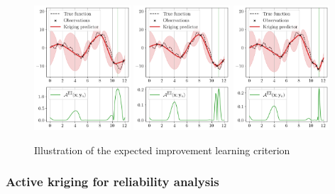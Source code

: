\begin{figure}[ht]
    \centering
    \includegraphics[width=0.32\textwidth]{../numerical_experiments/chapter1/figures/bayesian_opt_0.png}
    \includegraphics[width=0.32\textwidth]{../numerical_experiments/chapter1/figures/bayesian_opt_1.png}
    \includegraphics[width=0.32\textwidth]{../numerical_experiments/chapter1/figures/bayesian_opt_2.png}
    \caption{Illustration of the expected improvement learning criterion}
    \label{fig:EGO_1D}
\end{figure}

\subsubsection{Active kriging for reliability analysis}

